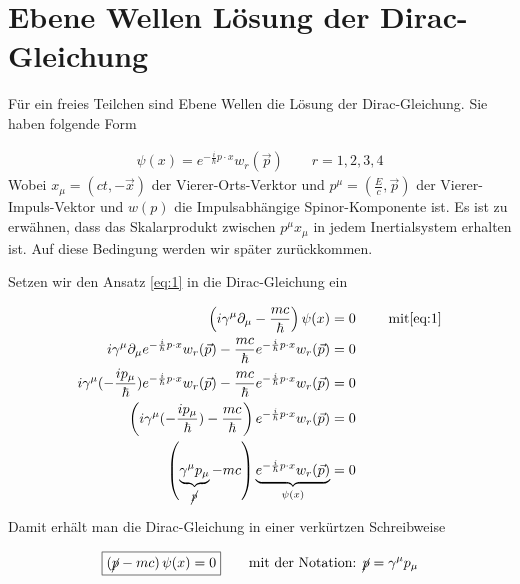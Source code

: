 
\usepackage{amsmath} 





\section*{Ebene Wellen Lösung der Dirac-Gleichung}

Für ein freies Teilchen sind Ebene Wellen die Lösung der Dirac-Gleichung. Sie haben folgende Form

\begin{align}
  \label{eq:1}
  \psi(x) = e^{-\frac{i}{\hbar}p\cdot x}w_r(\vec p) \qquad r=1,2,3,4
 \end{align}
Wobei \(x_\mu=(ct,-\vec x)\) der Vierer-Orts-Verktor und \(p^{\mu}=(\frac{E}{c},\vec p)\) der Vierer-Impuls-Vektor und \(w(p)\) die Impulsabhängige Spinor-Komponente ist.  Es ist zu erwähnen, dass das Skalarprodukt zwischen \(p^\mu x_\mu\) in jedem Inertialsystem erhalten ist. Auf diese Bedingung werden wir später zurückkommen.


Setzen wir den Ansatz \eqref{eq:1} in die Dirac-Gleichung ein

\begin{align}
  \label{eq:3}
  \left(i \gamma^\mu \partial_\mu-\frac{mc}{\hbar}  \right)\psi(x) &= 0 \qquad\text{ mit} \eqref{eq:1}   \notag \\
 i \gamma^\mu \partial_\mu  e^{-\frac{i}{\hbar}p\cdot x}w_r(\vec p) -\frac{mc}{\hbar} e^{-\frac{i}{\hbar}p\cdot x}w_r(\vec p)  &= 0  \notag \\
 i \gamma^\mu (-\frac{ip_\mu}{\hbar}) e^{-\frac{i}{\hbar}p\cdot x}w_r(\vec p) -\frac{mc}{\hbar} e^{-\frac{i}{\hbar}p\cdot x}w_r(\vec p)  &= 0  \notag \\
 \left(i \gamma^\mu (-\frac{ip_\mu}{\hbar}) -\frac{mc}{\hbar}\right) e^{-\frac{i}{\hbar}p\cdot x}w_r(\vec p)  &= 0  \notag \\
 \left(\underbr{ \gamma^\mu p_\mu}_{\cancel p} - mc\right)\underbr{ e^{-\frac{i}{\hbar}p\cdot x}w_r(\vec p)}_{\psi(x)}  &= 0 
\end{align}

Damit erhält man die Dirac-Gleichung in einer verkürtzen Schreibweise

\begin{align}
  \label{eq:4}
 \boxed{ \left(\cancel p - mc\right)\psi(x) = 0 }\qquad \text{mit der Notation: }\cancel p = \gamma^\mu p_\mu
\end{align}


